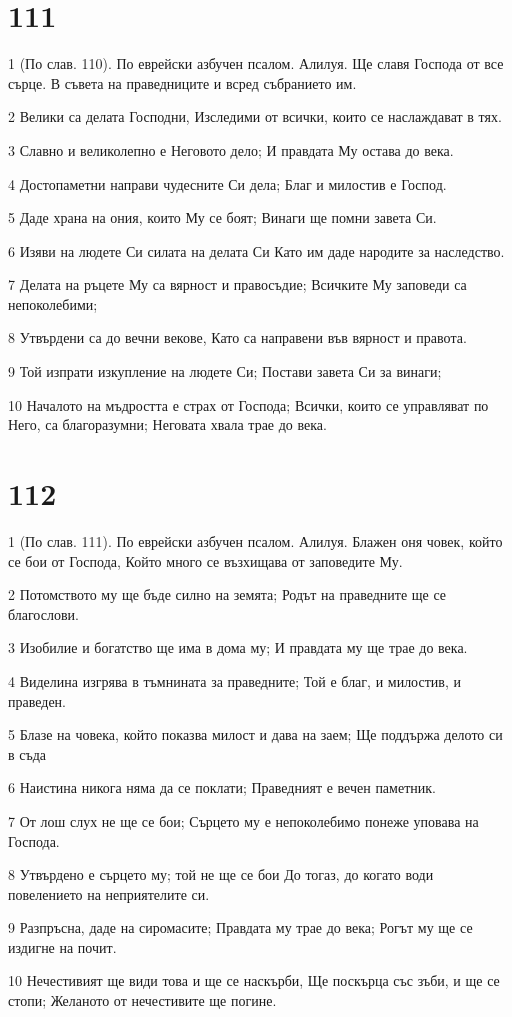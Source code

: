 \chapter{111}

\par 1 (По слав. 110). По еврейски азбучен псалом. Алилуя. Ще славя Господа от все сърце. В съвета на праведниците и всред събранието им.
\par 2 Велики са делата Господни, Изследими от всички, които се наслаждават в тях.
\par 3 Славно и великолепно е Неговото дело; И правдата Му остава до века.
\par 4 Достопаметни направи чудесните Си дела; Благ и милостив е Господ.
\par 5 Даде храна на ония, които Му се боят; Винаги ще помни завета Си.
\par 6 Изяви на людете Си силата на делата Си Като им даде народите за наследство.
\par 7 Делата на ръцете Му са вярност и правосъдие; Всичките Му заповеди са непоколебими;
\par 8 Утвърдени са до вечни векове, Като са направени във вярност и правота.
\par 9 Той изпрати изкупление на людете Си; Постави завета Си за винаги;
\par 10 Началото на мъдростта е страх от Господа; Всички, които се управляват по Него, са благоразумни; Неговата хвала трае до века.

\chapter{112}

\par 1 (По слав. 111). По еврейски азбучен псалом. Алилуя. Блажен оня човек, който се бои от Господа, Който много се възхищава от заповедите Му.
\par 2 Потомството му ще бъде силно на земята; Родът на праведните ще се благослови.
\par 3 Изобилие и богатство ще има в дома му; И правдата му ще трае до века.
\par 4 Виделина изгрява в тъмнината за праведните; Той е благ, и милостив, и праведен.
\par 5 Блазе на човека, който показва милост и дава на заем; Ще поддържа делото си в съда
\par 6 Наистина никога няма да се поклати; Праведният е вечен паметник.
\par 7 От лош слух не ще се бои; Сърцето му е непоколебимо понеже уповава на Господа.
\par 8 Утвърдено е сърцето му; той не ще се бои До тогаз, до когато води повелението на неприятелите си.
\par 9 Разпръсна, даде на сиромасите; Правдата му трае до века; Рогът му ще се издигне на почит.
\par 10 Нечестивият ще види това и ще се наскърби, Ще поскърца със зъби, и ще се стопи; Желаното от нечестивите ще погине.

